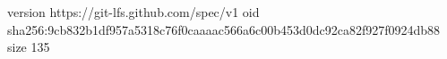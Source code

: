 version https://git-lfs.github.com/spec/v1
oid sha256:9cb832b1df957a5318c76f0caaaac566a6c00b453d0dc92ca82f927f0924db88
size 135
